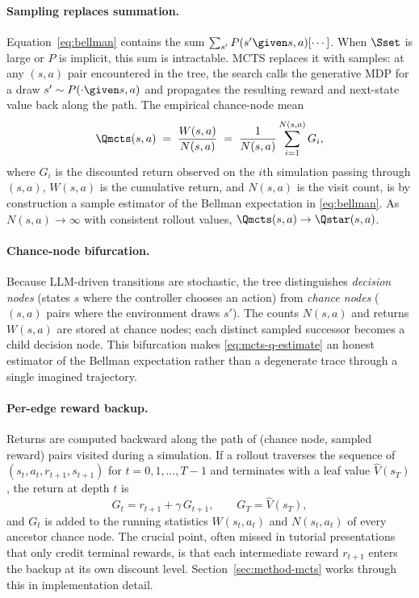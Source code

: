 \paragraph{Sampling replaces summation.}
Equation~\eqref{eq:bellman} contains the sum
$\sum_{s'} P(s' \given s, a) [\cdots]$. When $\Sset$ is large or $P$ is
implicit, this sum is intractable. MCTS replaces it with samples: at any
$(s, a)$ pair encountered in the tree, the search calls the generative
MDP for a draw $s' \sim P(\cdot \given s, a)$ and propagates the
resulting reward and next-state value back along the path. The empirical
chance-node mean
\begin{equation}
\Qmcts(s, a) \;=\; \frac{W(s, a)}{N(s, a)}
\;=\; \frac{1}{N(s, a)} \sum_{i=1}^{N(s, a)} G_i,
\label{eq:mcts-q-estimate}
\end{equation}
where $G_i$ is the discounted return observed on the $i$th simulation
passing through $(s, a)$, $W(s, a)$ is the cumulative return, and
$N(s, a)$ is the visit count, is by construction a sample estimator of
the Bellman expectation in \eqref{eq:bellman}. As $N(s, a) \to \infty$
with consistent rollout values, $\Qmcts(s, a) \to \Qstar(s, a)$.

\paragraph{Chance-node bifurcation.}
Because LLM-driven transitions are stochastic, the tree distinguishes
\emph{decision nodes} (states $s$ where the controller chooses an
action) from \emph{chance nodes} ($(s, a)$ pairs where the environment
draws $s'$). The counts $N(s, a)$ and returns $W(s, a)$ are stored at
chance nodes; each distinct sampled successor becomes a child decision
node. This bifurcation makes \eqref{eq:mcts-q-estimate} an honest
estimator of the Bellman expectation rather than a degenerate trace
through a single imagined trajectory.

\paragraph{Per-edge reward backup.}
Returns are computed backward along the path of (chance node, sampled
reward) pairs visited during a simulation. If a rollout traverses the
sequence of $(s_t, a_t, r_{t+1}, s_{t+1})$ for $t = 0, 1, \ldots, T-1$ and
terminates with a leaf value $\hat V(s_T)$, the return at depth $t$ is
\begin{equation}
G_t = r_{t+1} + \gamma\, G_{t+1}, \qquad G_T = \hat V(s_T),
\label{eq:per-edge-backup}
\end{equation}
and $G_t$ is added to the running statistics $W(s_t, a_t)$ and
$N(s_t, a_t)$ of every ancestor chance node. The crucial point, often
missed in tutorial presentations that only credit terminal rewards, is
that each intermediate reward $r_{t+1}$ enters the backup at its own
discount level. Section~\ref{sec:method-mcts} works through this in
implementation detail.

